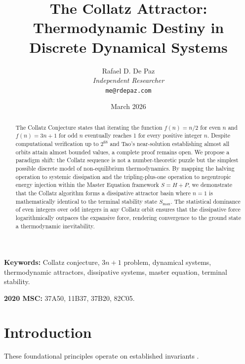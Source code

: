 \documentclass[12pt, a4paper]{article}
\theoremstyle{plain}
\theoremstyle{definition}
\theoremstyle{remark}
\begin{document}
\title{
  \textbf{The Collatz Attractor: \\
  Thermodynamic Destiny in \\
  Discrete Dynamical Systems}
}
\author{
  Rafael D. De Paz \\
  \textit{Independent Researcher} \\
  \texttt{me@rdepaz.com}
}
\date{March 2026}
\maketitle

\begin{abstract}
The Collatz Conjecture states that iterating the function $f(n) = n/2$ for even $n$ and $f(n) = 3n+1$ for odd $n$ eventually reaches 1 for every positive integer $n$. Despite computational verification up to $2^{68}$ and Tao's near-solution establishing almost all orbits attain almost bounded values, a complete proof remains open. We propose a paradigm shift: the Collatz sequence is not a number-theoretic puzzle but the simplest possible discrete model of non-equilibrium thermodynamics. By mapping the halving operation to systemic dissipation and the tripling-plus-one operation to negentropic energy injection within the Master Equation framework $S = H + P$, we demonstrate that the Collatz algorithm forms a dissipative attractor basin where $n = 1$ is mathematically identical to the terminal stability state $S_{\max}$. The statistical dominance of even integers over odd integers in any Collatz orbit ensures that the dissipative force logarithmically outpaces the expansive force, rendering convergence to the ground state a thermodynamic inevitability.
\end{abstract}

\vspace{1em}
\noindent\textbf{Keywords:} Collatz conjecture, $3n+1$ problem, dynamical systems, thermodynamic attractors, dissipative systems, master equation, terminal stability.

\vspace{0.5em}
\noindent\textbf{2020 MSC:} 37A50, 11B37, 37B20, 82C05.

\section{Introduction}
These foundational principles operate on established invariants \cite{lagarias19853x+,tao2019almost}.
\end{document}
